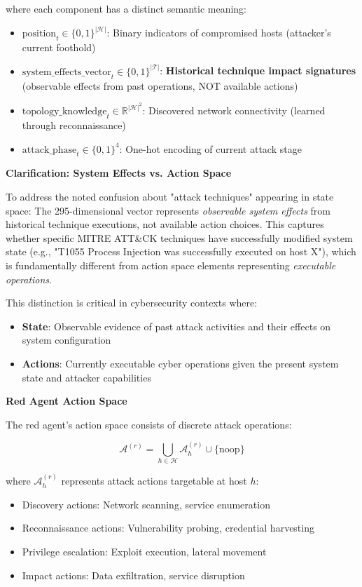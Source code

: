 \documentclass[12pt,oneside]{article}
\begin{document}
where each component has a distinct semantic meaning:

\begin{itemize}
    \item $\text{position}_t \in \{0,1\}^{|\mathcal{H}|}$: Binary indicators of compromised hosts (attacker's current foothold)
    \item $\text{system\_effects\_vector}_t \in \{0,1\}^{|\mathcal{T}|}$: \textbf{Historical technique impact signatures} (observable effects from past operations, NOT available actions)
    \item $\text{topology\_knowledge}_t \in \mathbb{R}^{|\mathcal{H}|^2}$: Discovered network connectivity (learned through reconnaissance)
    \item $\text{attack\_phase}_t \in \{0,1\}^4$: One-hot encoding of current attack stage
\end{itemize}

\textbf{Clarification: System Effects vs. Action Space}

To address the noted confusion about "attack techniques" appearing in state space: The 295-dimensional vector represents \textit{observable system effects} from historical technique executions, not available action choices. This captures whether specific MITRE ATT\&CK techniques have successfully modified system state (e.g., "T1055 Process Injection was successfully executed on host X"), which is fundamentally different from action space elements representing \textit{executable operations}.

This distinction is critical in cybersecurity contexts where:
\begin{itemize}
    \item \textbf{State}: Observable evidence of past attack activities and their effects on system configuration
    \item \textbf{Actions}: Currently executable cyber operations given the present system state and attacker capabilities
\end{itemize}

\textbf{Red Agent Action Space}

The red agent's action space consists of discrete attack operations:

\begin{equation}
\mathcal{A}^{(r)} = \bigcup_{h \in \mathcal{H}} \mathcal{A}^{(r)}_h \cup \{\text{noop}\}
\end{equation}

where $\mathcal{A}^{(r)}_h$ represents attack actions targetable at host $h$:
\begin{itemize}
    \item Discovery actions: Network scanning, service enumeration
    \item Reconnaissance actions: Vulnerability probing, credential harvesting  
    \item Privilege escalation: Exploit execution, lateral movement
    \item Impact actions: Data exfiltration, service disruption
\end{itemize}
\end{document}
